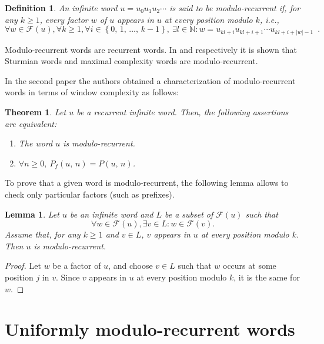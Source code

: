 \documentclass[a4 paper,12pt]{article}
\newtheorem{theorem}{Theorem}[section]
\newtheorem{lemma}{Lemma}[section]
\newtheorem{definition}{Definition}[section]
\newcommand{\ie}{\emph{i.e.}}
\begin{document}
\begin{definition} An infinite word $u=u_0u_1u_2\cdots$ is said to be modulo-recurrent if, for any $k\geq1$, every factor $w$ of $u$ appears in $u$ at every position modulo $k$, \ie,
$$\forall w\in\mathcal{F}(u), \forall k\geq 1, \forall i\in\left\{0,\,1,\,\ldots,\,k-1\right\},\ \exists l\in\mathbb{N} : w=u_{kl+i}u_{kl+i+1}\cdots u_{kl+i+|w|-1}\enspace.
$$
\end{definition}

Modulo-recurrent words  are recurrent words. In \cite{12} and \cite{9} respectively it is shown that Sturmian words and maximal complexity words are modulo-recurrent.

In the second paper the authors obtained a characterization of modulo-recurrent words in terms of window complexity as follows: %


\begin{theorem}
\label{thm-modulo}
Let $u$ be a recurrent infinite word. Then, the following assertions are equivalent:
\begin{enumerate}
\item The word $u$ is modulo-recurrent.
\item $\forall n\geq 0,\ P_f(u,\, n)= P(u,\,n)$.
\end{enumerate}
\end{theorem}

To prove that a given word is modulo-recurrent, the following lemma allows to check only particular factors (such as prefixes).

\begin{lemma} \label{modulo-prefix}
Let $u$ be an infinite word and $L$ be a subset of $\mathcal{F}(u)$ such that 
$$\forall w\in \mathcal{F}(u), \exists v\in L : w\in \mathcal{F}(v).$$
Assume that, for any $k\geq 1$ and $v\in L$, $v$ appears in $u$ at every position modulo $k$. Then $u$ is modulo-recurrent.
\end{lemma}

\begin{proof}
Let $w$ be a factor of $u$, and choose $v\in L$ such that $w$ occurs at  some position $j$ in $v$. Since $v$ appears  in $u$ at every position modulo $k$, it is the same for $w$.

\end{proof}

\section{Uniformly modulo-recurrent words}
\end{document}
